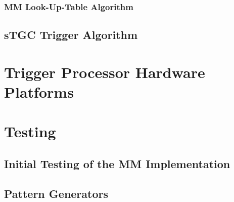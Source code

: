 \documentclass[USenglish]{latex/atlasdoc}
\begin{document}
\subsubsection{MM Look-Up-Table Algorithm}
\label{sec:algorithms-saclay}

\FloatBarrier

\subsection{sTGC Trigger Algorithm}
\label{sec:algorithms-stgc}

\FloatBarrier

%


\section{Trigger Processor Hardware Platforms}
\label{sec:hardware-platforms}


\section{Testing}
\label{sec:testing}

\subsection{Initial Testing of the MM Implementation}
\label{sec:testing-mmTrigProcImp}

\subsection{Pattern Generators}
\label{sec:testing-pg}

\end{document}

